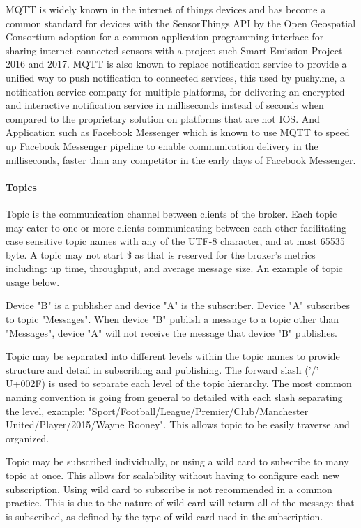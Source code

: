 MQTT is widely known in the internet of things devices and has become a common standard for devices with the SensorThings API by the Open Geospatial Consortium adoption for a common application programming interface for sharing internet-connected sensors with a project such Smart Emission Project 2016 and 2017. MQTT is also known to replace notification service to provide a unified way to push notification to connected services, this used by pushy.me, a notification service company for multiple platforms, for delivering an encrypted and interactive notification service in milliseconds instead of seconds when compared to the proprietary solution on platforms that are not IOS. And Application such as Facebook Messenger which is known to use MQTT to speed up Facebook Messenger pipeline to enable communication delivery in the milliseconds, faster than any competitor in the early days of Facebook Messenger.


\paragraph{Topics}
Topic is the communication channel between clients of the broker. Each topic may cater to one or more clients communicating between each other facilitating case sensitive topic names with any of the UTF-8 character, and at most 65535 byte. A topic may not start \$ as that is reserved for the broker's metrics including: up time, throughput, and average message size. An example of topic usage below.

Device "B" is a publisher and device "A" is the subscriber. Device "A" subscribes to topic "Messages". When device "B" publish a message to a topic other than "Messages", device "A" will not receive the message that device "B" publishes.

Topic may be separated into different levels within the topic names to provide structure and detail in subscribing and publishing. The forward slash ('/' U+002F) is used to separate each level of the topic hierarchy. The most common naming convention is going from general to detailed with each slash separating the level, example: "Sport/Football/League/Premier/Club/Manchester United/Player/2015/Wayne Rooney". This allows topic to be easily traverse and organized.

Topic may be subscribed individually, or using a wild card to subscribe to many topic at once. This allows for scalability without having to configure each new subscription. Using wild card to subscribe is not recommended in a common practice. This is due to the nature of wild card will return all of the message that is subscribed, as defined by the type of wild card used in the subscription.

